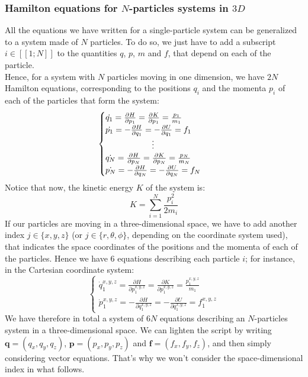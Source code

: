     \subsubsection{Hamilton equations for $N$-particles systems in $3D$}
        All the equations we have written for a single-particle system can be generalized to a system made of $N$ particles. To do so, we just have to add a subscript $i \in  [\![ 1;N ]\!]$ to the quantities $q$, $p$, $m$ and $f$, that depend on each of the particle.
        \\Hence, for a system with $N$ particles moving in one dimension, we have $2N$ Hamilton equations, corresponding to the positions $q_i$ and the momenta $p_i$ of each of the particles that form the system:
        \begin{equation}
        \begin{cases}
            \dot{q_1}=\frac{\partial H}{\partial p_1}=\frac{\partial K}{\partial p_1}=\frac{p_1}{m_1}\\
            \dot{p_1}=-\frac{\partial H}{\partial q_1}=-\frac{\partial U}{\partial q_1}=f_1\\
            \hfil \vdots\\
            \dot{q_N}=\frac{\partial H}{\partial p_N}=\frac{\partial K}{\partial p_N}=\frac{p_N}{m_N}\\
            \dot{p_N}=-\frac{\partial H}{\partial q_N}=-\frac{\partial U}{\partial q_N}=f_N
        \end{cases}
        \end{equation}
        Notice that now, the kinetic energy $K$ of the system is:
        \begin{equation}
            K=\sum_{i=1}^N\frac{p_i^2}{2 m_i}
        \end{equation}
        If our particles are moving in a three-dimensional space, we have to add another index $j \in  \{ x,y,z \}$ (or $j \in  \{r,\theta,\phi\}$, depending on the coordinate system used), that indicates the space coordinates of the positions and the momenta of each of the particles. Hence we have $6$ equations describing each particle $i$; for instance, in the Cartesian coordinate system:
        \begin{equation}
        \begin{cases}
            \dot{q}_1^{x,y,z}=\frac{\partial H}{\partial p_1^{x,y,z}}=\frac{\partial K}{\partial p_1^{x,y,z}}=\frac{p_1^{x,y,z}}{m_1}\\
            \dot{p}_1^{x,y,z}=-\frac{\partial H}{\partial q_1^{x,y,z}}=-\frac{\partial U}{\partial q_1^{x,y,z}}=f_1^{x,y,z}
        \end{cases}
        \end{equation}
        We have therefore in total a system of $6N$ equations describing an $N$-particles system in a three-dimensional space. We can lighten the script by writing $\textbf{q}=(q_x,q_y,q_z)$, $\textbf{p}=(p_x,p_y,p_z)$ and $\textbf{f}=(f_x,f_y,f_z)$, and then simply considering vector equations. That's why we won't consider the space-dimensional index in what follows.
        
